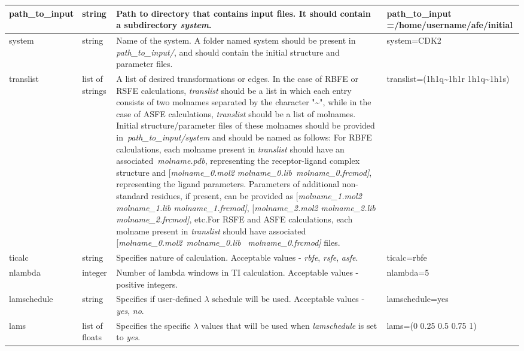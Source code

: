 \documentclass[11pt,letterpaper,titlepage]{article}
\begin{document}
\begin{footnotesize}
\begin{landscape}
\begin{center}
\begin{longtable}[1]{p{3cm}|p{0.5cm}|p{11cm}|p{4cm}}
path\_to\_input    & string          & Path to directory that contains input files. It should contain a subdirectory \textit{system}.  & path\_to\_input =/home/username/afe/initial                       \\ 
\hline
system             & string          & Name of the system. A folder named system should be present in \textit{path\_to\_input/}, and should contain the initial structure and parameter files.      & system=CDK2             \\ 
\hline
translist          & list of strings & A list of desired transformations or edges. In the case of RBFE or RSFE calculations, \textit{translist} should be a list in which each entry consists of two molnames separated by the character "\textasciitilde{}", while in the case of ASFE calculations, \textit{translist} should be a list of molnames. Initial structure/parameter files of these molnames should be provided in~\textit{path\_to\_input/system }and should be named as follows:  \newline For RBFE calculations, each molname present in \textit{translist} should have an associated~\textit{molname.pdb}, representing the receptor-ligand complex structure and [\textit{molname\_0.mol2 molname\_0.lib}~\textit{molname\_0.frcmod]}, representing the ligand parameters. Parameters of additional non-standard residues, if present, can be provided as [\textit{molname\_1.mol2 molname\_1.lib molname\_1.frcmod]}, [\textit{molname\_2.mol2 molname\_2.lib molname\_2.frcmod]}, etc.\newline For RSFE and ASFE calculations, each molname present in \textit{translist} should have associated [\textit{molname\_0.mol2}~\textit{molname\_0.lib}~ \textit{molname\_0.frcmod] }files. & translist=(1h1q\textasciitilde{}1h1r 1h1q\textasciitilde{}1h1s)  \\ 
\hline
ticalc             & string          & Specifies nature of calculation. Acceptable values - \textit{rbfe}, \textit{rsfe}, \textit{asfe}.   & ticalc=rbfe  \\ 
\hline
nlambda            & integer         & Number of lambda windows in TI calculation. Acceptable values - positive integers.   & nlambda=5   \\ 
\hline
	lamschedule        & string          & Specifies if user-defined $\lambda$ schedule will be used. Acceptable values - \textit{yes}, \textit{no}.   & lamschedule=yes   \\ 
\hline
	lams        & list of floats          & Specifies the specific $\lambda$ values that will be used when \textit{lamschedule} is set to \textit{yes}.  & lams=(0 0.25 0.5 0.75 1)   \\ 

\end{longtable}
\end{center}
\end{landscape}
\end{footnotesize}
\end{document}
